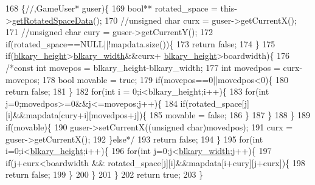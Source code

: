 \begin{DoxyCode}
168                                                                                                            
                         \{\textcolor{comment}{//,GameUser* guser)\{}
169                 \textcolor{keywordtype}{bool}** rotated\_space = this->\hyperlink{class_tetris_1_1_block_a464ed776185993ad827f316a08969960}{getRotatedSpaceData}();
170                 \textcolor{comment}{//unsigned char curx = guser->getCurrentX();}
171                 \textcolor{comment}{//unsigned char cury = guser->getCurrentY();}
172                 \textcolor{keywordflow}{if}(rotated\_space==NULL||!mapdata.size())\{
173                     \textcolor{keywordflow}{return} \textcolor{keyword}{false};
174                 \}
175                 \textcolor{keywordflow}{if}(\hyperlink{class_tetris_1_1_block_abbea7737c2b1fb7339aab4dff13de27c}{blkary\_height}>\hyperlink{class_tetris_1_1_block_a96548cab58eb788af744b54192c7bea1}{blkary\_width}&&curx+
      \hyperlink{class_tetris_1_1_block_abbea7737c2b1fb7339aab4dff13de27c}{blkary\_height}>boardwidth)\{
176                    \textcolor{comment}{/*const int movepos = blkary\_height-blkary\_width;}
177 \textcolor{comment}{                    int movedpos = curx-movepos;}
178 \textcolor{comment}{                    bool movable = true;}
179 \textcolor{comment}{                    if(movepos==0||movedpos<0)\{}
180 \textcolor{comment}{                        return false;}
181 \textcolor{comment}{                    \}}
182 \textcolor{comment}{                    for(int i = 0;i<blkary\_height;i++)\{}
183 \textcolor{comment}{                        for(int j=0;movedpos>=0&&j<=movepos;j++)\{}
184 \textcolor{comment}{                            if(rotated\_space[j][i]&&mapdata[cury+i][movedpos+j])\{}
185 \textcolor{comment}{                                movable = false;}
186 \textcolor{comment}{                            \}}
187 \textcolor{comment}{                        \}}
188 \textcolor{comment}{                    \}}
189 \textcolor{comment}{                    if(movable)\{}
190 \textcolor{comment}{                        guser->setCurrentX((unsigned char)movedpos);}
191 \textcolor{comment}{                        curx = guser->getCurrentX();}
192 \textcolor{comment}{                    \}else*/}
193                     \textcolor{keywordflow}{return} \textcolor{keyword}{false};
194                 \}
195                 \textcolor{keywordflow}{for}(\textcolor{keywordtype}{int} i=0;i<\hyperlink{class_tetris_1_1_block_abbea7737c2b1fb7339aab4dff13de27c}{blkary\_height};i++)\{
196                     \textcolor{keywordflow}{for}(\textcolor{keywordtype}{int} j=0;j<\hyperlink{class_tetris_1_1_block_a96548cab58eb788af744b54192c7bea1}{blkary\_width};j++)\{
197                         \textcolor{keywordflow}{if}(j+curx<boardwidth && rotated\_space[j][i]&&mapdata[i+cury][j+curx])\{
198                             \textcolor{keywordflow}{return} \textcolor{keyword}{false};
199                         \}
200                     \}
201                 \}
202                 \textcolor{keywordflow}{return} \textcolor{keyword}{true};
203             \}
\end{DoxyCode}
